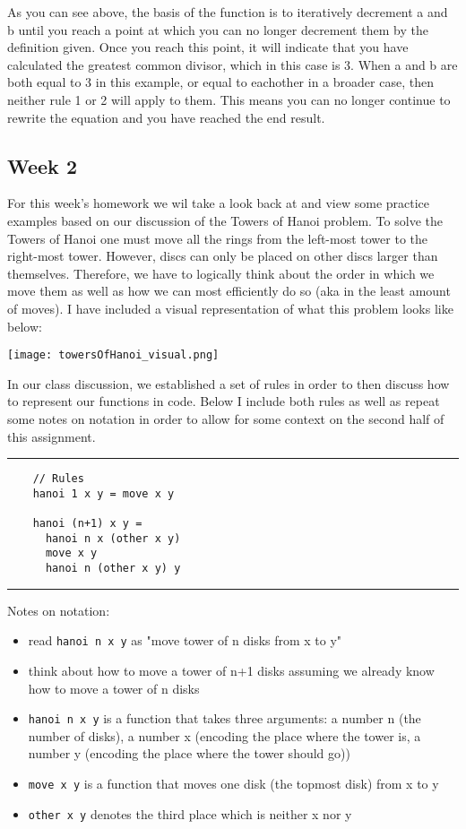 \documentclass{article}
\theoremstyle{theorem}
\theoremstyle{definition}
\theoremstyle{remark}
\begin{document}
As you can see above, the basis of the function is to iteratively decrement a and b until you reach a point at which you can no longer
decrement them by the definition given. Once you reach this point, it will indicate that you have calculated the greatest common divisor, which 
in this case is 3. When a and b are both equal to 3 in this example, or equal to eachother in a broader case, then neither rule 1 or 2 will apply to them. This means you can no longer 
continue to rewrite the equation and you have reached the end result. 

\subsection{Week 2}
For this week's homework we wil take a look back at and view some practice examples based on our discussion of the Towers of Hanoi problem. To solve the Towers of Hanoi one must move all the rings
from the left-most tower to the right-most tower. However, discs can only be placed on other discs larger than themselves. Therefore, we have to logically think about the 
order in which we move them as well as how we can most efficiently do so (aka in the least amount of moves). I have included a visual representation of what this problem looks like below: 
\begin{center}
  \texttt{[image: towersOfHanoi\_visual.png]}
\end{center}

In our class discussion, we established a set of rules in order to then discuss how to represent our functions in code. Below I include both rules as well as repeat some notes on notation 
in order to allow for some context on the second half of this assignment.\\
\noindent
  {\color{gray} \rule{\linewidth}{0.05mm}}
\begin{center}
  \begin{verbatim}
    // Rules
    hanoi 1 x y = move x y 

    hanoi (n+1) x y = 
      hanoi n x (other x y)
      move x y 
      hanoi n (other x y) y
  \end{verbatim}
\end{center}
\noindent
  {\color{gray} \rule{\linewidth}{0.05mm}}

Notes on notation: 
\begin{itemize}
  \item read \texttt{hanoi n x y} as "move tower of n disks from x to y"
  \item think about how to move a tower of n+1 disks assuming we already know how to move a tower of n disks 
  \item \texttt{hanoi n x y} is a function that takes three arguments: a number n (the number of disks), a number x (encoding the place where the tower is, a number y (encoding the place
  where the tower should go))
  \item \texttt{move x y} is a function that moves one disk (the topmost disk) from x to y 
  \item \texttt{other x y} denotes the third place which is neither x nor y 
\end{itemize}
\end{document}

